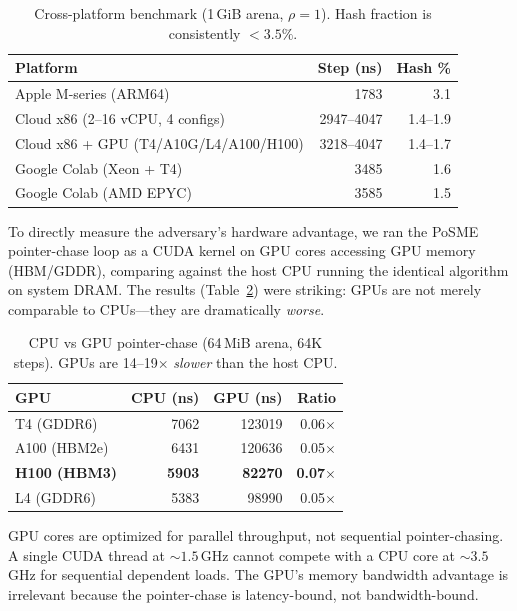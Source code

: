 \documentclass[conference,twocolumn]{IEEEtran}
\begin{document}
\begin{table}[!ht]
\centering
\caption{Cross-platform benchmark (1\,GiB arena, $\rho{=}1$).
Hash fraction is consistently $< 3.5\%$.}
\begin{tabular*}{\columnwidth}{@{\extracolsep{\fill}}lrr@{}}
\toprule
Platform & Step (ns) & Hash \% \\
\midrule
Apple M-series (ARM64) & 1783 & 3.1 \\
Cloud x86 (2--16 vCPU, 4 configs) & 2947--4047 & 1.4--1.9 \\
Cloud x86 + GPU (T4/A10G/L4/A100/H100) & 3218--4047 & 1.4--1.7 \\
Google Colab (Xeon + T4) & 3485 & 1.6 \\
Google Colab (AMD EPYC) & 3585 & 1.5 \\
\bottomrule
\end{tabular*}
\label{tab:crossplat}
\end{table}

To directly measure the adversary's hardware advantage, we ran
the PoSME pointer-chase loop as a CUDA kernel on GPU cores
accessing GPU memory (HBM/GDDR), comparing against the host CPU
running the identical algorithm on system DRAM. The results
(Table~\ref{tab:gpu}) were striking: GPUs are not merely
comparable to CPUs---they are dramatically \emph{worse}.

\begin{table}[b]
\centering
\caption{CPU vs GPU pointer-chase (64\,MiB arena, 64K steps).
GPUs are 14--19$\times$ \emph{slower} than the host CPU.}
\begin{tabular*}{\columnwidth}{@{\extracolsep{\fill}}lrrr@{}}
\toprule
GPU & CPU (ns) & GPU (ns) & Ratio \\
\midrule
T4 (GDDR6) & 7062 & 123019 & 0.06$\times$ \\
A100 (HBM2e) & 6431 & 120636 & 0.05$\times$ \\
\textbf{H100 (HBM3)} & \textbf{5903} & \textbf{82270} & \textbf{0.07}$\boldsymbol{\times}$ \\
L4 (GDDR6) & 5383 & 98990 & 0.05$\times$ \\
\bottomrule
\end{tabular*}
\label{tab:gpu}
\end{table}

GPU cores are optimized for parallel throughput, not sequential
pointer-chasing. A single CUDA thread at ${\sim}1.5$\,GHz cannot
compete with a CPU core at ${\sim}3.5$\,GHz for sequential
dependent loads. The GPU's memory bandwidth advantage is
irrelevant because the pointer-chase is latency-bound, not
bandwidth-bound.
\end{document}
